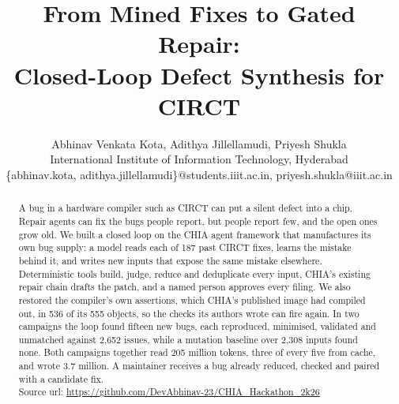 \documentclass[conference]{IEEEtran}
\begin{document}
\title{From Mined Fixes to Gated Repair:\\Closed-Loop Defect Synthesis for CIRCT}

\author{
  Abhinav Venkata Kota, Adithya Jillellamudi, Priyesh Shukla \\
  International Institute of Information Technology, Hyderabad \\
  \{abhinav.kota, adithya.jillellamudi\}@students.iiit.ac.in, priyesh.shukla@iiit.ac.in
}

\maketitle

\begin{abstract}
A bug in a hardware compiler such as CIRCT can put a silent defect into a chip.
Repair agents can fix the bugs people report, but people report few, and the
open ones grow old. We built a closed loop on the CHIA agent framework that
manufactures its own bug supply: a model reads each of 187 past CIRCT fixes, %
learns the mistake behind it, and writes new inputs that expose the same mistake
elsewhere. Deterministic tools build, judge, reduce and deduplicate every input,
CHIA's existing repair chain drafts the patch, and a named person approves every
filing. We also restored the compiler's own assertions, which CHIA's published
image had compiled out, in 536 of its 555 objects, %
so the checks its authors wrote can fire again. In two campaigns the
loop found fifteen new bugs, each reproduced, minimised, validated and unmatched
against 2,652 issues, %
while a mutation baseline over 2,308 inputs found none. %
Both campaigns together read 205 million tokens, three of every five from cache,
and wrote 3.7 million. %
A maintainer receives a bug already reduced, checked and paired with a candidate
fix. \\
Source url: \url{https://github.com/DevAbhinav-23/CHIA_Hackathon_2k26}
\end{abstract}
\end{document}
